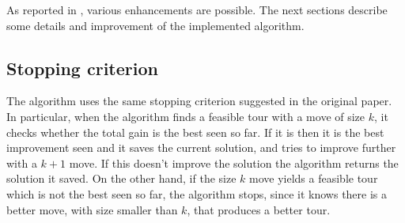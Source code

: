 
As reported in \cite{LinK73}, various enhancements are possible. The next sections describe some details and improvement of the implemented algorithm.

\subsection{Stopping criterion}
The algorithm uses the same stopping criterion suggested in the original paper. In particular, when the algorithm finds a feasible tour with a move of size $k$, it checks whether the total gain is the best seen so far. If it is then it is the best improvement seen and it saves the current solution, and tries to improve further with a $k+1$ move. If this doesn't improve the solution the algorithm returns the solution it saved. On the other hand, if the size $k$ move yields a feasible tour which is not the best seen so far, the algorithm stops, since it knows there is a better move, with size smaller than $k$, that produces a better tour.

